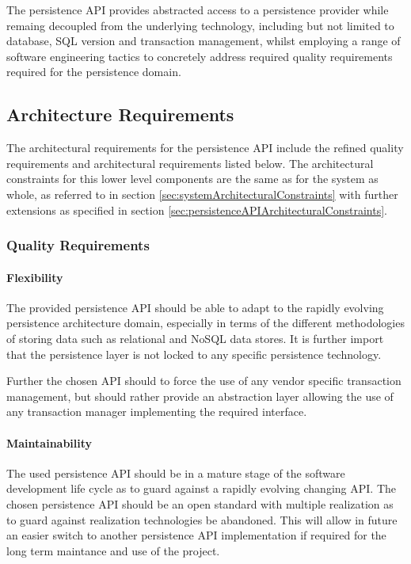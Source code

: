 The persistence API provides abstracted access to a persistence provider while
remaing decoupled from the underlying technology, including but not limited to
database, SQL version and transaction management, whilst employing a range of
software engineering tactics to concretely address required quality
requirements required for the persistence domain.

\subsection{Architecture Requirements}
The architectural requirements for the persistence API include the refined
quality requirements and architectural requirements listed below. The
architectural constraints for this lower level components are the same as for
the system as whole, as referred to in
section \ref{sec:systemArchitecturalConstraints} with further extensions as
specified in section \ref{sec:persistenceAPIArchitecturalConstraints}.

\subsubsection{Quality Requirements}
\paragraph{Flexibility}
The provided persistence API should be able to adapt to the rapidly evolving
persistence architecture domain, especially in terms of the different
methodologies of storing data such as relational and NoSQL data stores. It is
further import that the persistence layer is not locked to any specific
persistence technology.

Further the chosen API should to force the use of any vendor specific
transaction management, but should rather provide an abstraction layer allowing
the use of any transaction manager implementing the required interface.

\paragraph{Maintainability}
\label{sec:persistenceAPIMaintainability}
The used persistence API should be in a mature stage of the software development
life cycle as to guard against a rapidly evolving changing API. The chosen
persistence API should be an open standard with multiple realization as to guard
against realization technologies be abandoned. This will allow in future an easier
switch to another persistence API implementation if required for the long term
maintance and use of the project.


